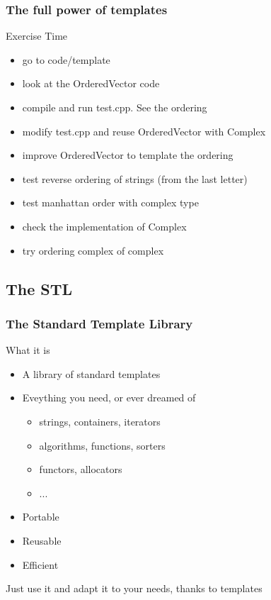 \begin{frame}[fragile]
  \frametitle{The full power of templates}
  \begin{alertblock}{Exercise Time}
    \begin{itemize}
    \item go to code/template
    \item look at the OrderedVector code
    \item compile and run test.cpp. See the ordering
    \item modify test.cpp and reuse OrderedVector with Complex
    \item improve OrderedVector to template the ordering
    \item test reverse ordering of strings (from the last letter)
    \item test manhattan order with complex type
    \item check the implementation of Complex
    \item try ordering complex of complex
    \end{itemize}
  \end{alertblock}
\end{frame}

\subsection[STL]{The STL}

\begin{frame}[fragile]
  \frametitle{The Standard Template Library}
  \begin{block}{What it is}
    \begin{itemize}
    \item A library of standard templates
    \item Eveything you need, or ever dreamed of
      \begin{itemize}
      \item strings, containers, iterators
      \item algorithms, functions, sorters
      \item functors, allocators
      \item ...
      \end{itemize}
    \item Portable
    \item Reusable
    \item Efficient
    \end{itemize}
  \end{block}
  \pause
  \begin{alertblock}{Just use it}
    and adapt it to your needs, thanks to templates
  \end{alertblock}
\end{frame}


